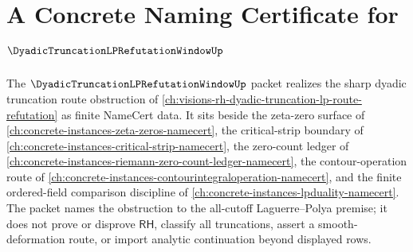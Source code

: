\chapter{A Concrete Naming Certificate for $\DyadicTruncationLPRefutationWindowUp$}
\label{ch:concrete-instances-dyadic-truncation-lp-refutation-window-namecert}

The $\DyadicTruncationLPRefutationWindowUp$ packet realizes the sharp dyadic truncation route obstruction of \autoref{ch:visions-rh-dyadic-truncation-lp-route-refutation} as finite NameCert data. It sits beside the zeta-zero surface of \autoref{ch:concrete-instances-zeta-zeros-namecert}, the critical-strip boundary of \autoref{ch:concrete-instances-critical-strip-namecert}, the zero-count ledger of \autoref{ch:concrete-instances-riemann-zero-count-ledger-namecert}, the contour-operation route of \autoref{ch:concrete-instances-contourintegraloperation-namecert}, and the finite ordered-field comparison discipline of \autoref{ch:concrete-instances-lpduality-namecert}. The packet names the obstruction to the all-cutoff Laguerre--Polya premise; it does not prove or disprove $\mathsf{RH}$, classify all truncations, assert a smooth-deformation route, or import analytic continuation beyond displayed rows.


